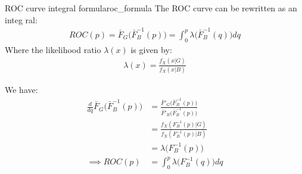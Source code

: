 \begin{proposition}{ROC curve integral formula}{roc_formula}
    The ROC curve can be rewritten as an integ  ral:
    \begin{align*}
        \boxed{
            ROC(p) = \bar F_G\Big( \bar F_B^{-1}(p) \Big) = \int_0^p \lambda\Big( \bar F_B^{-1}(q) \Big)dq
        }
    \end{align*}
    \noindent Where the likelihood ratio $\lambda(x)$ is given by:
    \begin{align*}
        \lambda(x) = \frac{f_X(x|G)}{f_X(x|B)}
    \end{align*}
\end{proposition}

\begin{proof*}
    We have:
    \begin{align*}
        \frac{d}{dq}\bar F_G\Big( \bar F_B^{-1}(p) \Big) 
            &= \frac{
                \bar F'_G\Big( \bar F_B^{-1}(p) \Big)
            }{
                \bar F'_B\Big( \bar F_B^{-1}(p) \Big)
            }
            \\
            &= \frac{f_X(F_B^{-1}(p)|G)}{f_X(F_B^{-1}(p)|B)} \\
            &= \lambda\Big(F_B^{-1}(p)\Big) \\
        \implies ROC(p) &= \int_0^p\lambda\Big(F_B^{-1}(q)\Big)dq
    \end{align*}
\end{proof*}